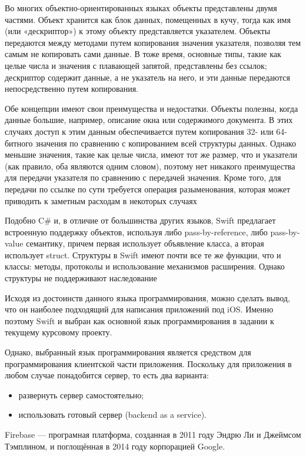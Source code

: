Во многих объектно-ориентированных языках объекты представлены двумя частями. Объект хранится как блок данных, помещенных в кучу, тогда как имя (или «дескриптор») к этому объекту представляется указателем. Объекты передаются между методами путем копирования значения указателя, позволяя тем самым не копировать сами данные. В тоже время, основные типы, такие как целые числа и значения с плавающей запятой, представлены без ссылок; дескриптор содержит данные, а не указатель на него, и эти данные передаются непосредственно путем копирования.

Обе концепции имеют свои преимущества и недостатки. Объекты полезны, когда данные большие, например, описание окна или содержимого документа. В этих случаях доступ к этим данным обеспечивается путем копирования 32- или 64-битного значения по сравнению с копированием всей структуры данных. Однако меньшие значения, такие как целые числа, имеют тот же размер, что и указатели (как правило, оба являются одним словом), поэтому нет никакого преимущества для передачи указателя по сравнению с передачей значения. Кроме того, для передачи по ссылке по сути требуется операция разыменования, которая может приводить к заметным расходам в некоторых случаях

Подобно C\# и, в отличие от большинства других языков, Swift предлагает встроенную поддержку объектов, используя либо pass-by-reference, либо pass-by-value семантику, причем первая использует объявление класса, а вторая использует struct. Структуры в Swift имеют почти все те же функции, что и классы: методы, протоколы и использование механизмов расширения. Однако структуры не поддерживают наследование

Исходя из достоинств данного языка программирования, можно сделать вывод, что он наиболее подходящий для написания приложений под iOS. Именно поэтому Swift и выбран как основной язык программирования в задании к текущему курсовому проекту.

Однако, выбранный язык программирования является средством для программирования клиентской части приложения. Поскольку для приложения в любом случае понадобится сервер, то есть два варианта: 

\begin{itemize}
	\item развернуть сервер самостоятельно;
	\item использовать готовый сервер (backend as a service).
\end{itemize}

Firebase — програмная платформа, созданная в 2011 году Эндрю Ли и Джеймсом Тэмплином, и поглощённая в 2014 году корпорацией Google.

